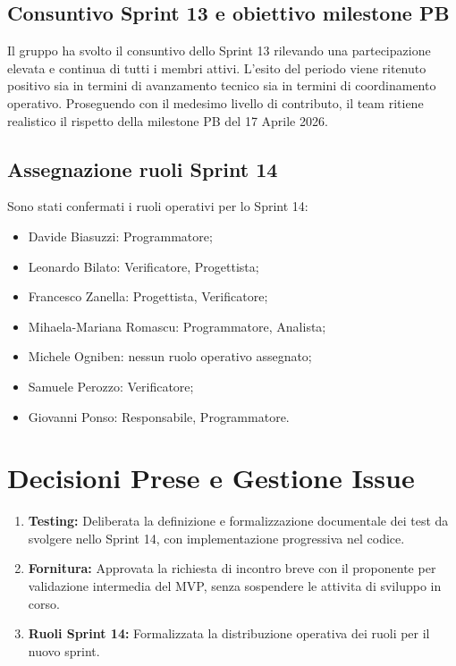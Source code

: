 \documentclass[a4paper, 11pt, oneside]{scrartcl} %
\begin{document}
\subsection{Consuntivo Sprint 13 e obiettivo milestone PB}
Il gruppo ha svolto il consuntivo dello Sprint 13 rilevando una partecipazione elevata e continua di tutti i membri attivi.
L'esito del periodo viene ritenuto positivo sia in termini di avanzamento tecnico sia in termini di coordinamento operativo. Proseguendo con il medesimo livello di contributo, il team ritiene realistico il rispetto della milestone PB del 17 Aprile 2026.

\subsection{Assegnazione ruoli Sprint 14}
Sono stati confermati i ruoli operativi per lo Sprint 14:
\begin{itemize}[noitemsep, topsep=2pt]
    \item Davide Biasuzzi: Programmatore;
    \item Leonardo Bilato: Verificatore, Progettista;
    \item Francesco Zanella: Progettista, Verificatore;
    \item Mihaela-Mariana Romascu: Programmatore, Analista;
    \item Michele Ogniben: nessun ruolo operativo assegnato;
    \item Samuele Perozzo: Verificatore;
    \item Giovanni Ponso: Responsabile, Programmatore.
\end{itemize}

\newpage
\section{Decisioni Prese e Gestione Issue}

\begin{enumerate}
    \item \textbf{Testing:} Deliberata la definizione e formalizzazione documentale dei test da svolgere nello Sprint 14, con implementazione progressiva nel codice.
    \item \textbf{Fornitura:} Approvata la richiesta di incontro breve con il proponente per validazione intermedia del MVP, senza sospendere le attivita di sviluppo in corso.
    \item \textbf{Ruoli Sprint 14:} Formalizzata la distribuzione operativa dei ruoli per il nuovo sprint.
\end{enumerate}
\end{document}
